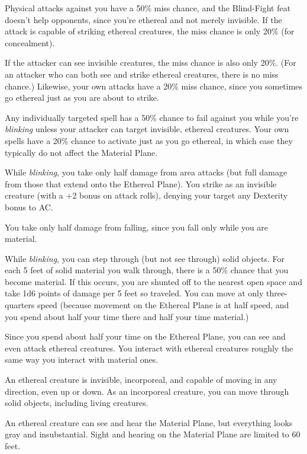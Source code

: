 \documentclass{article}
\begin{document}
Physical attacks against you have a 50\% miss chance, and the Blind-Fight feat 
doesn't help opponents, since you're ethereal and not merely invisible. If the 
attack is capable of striking ethereal creatures, the miss chance is only 20\% 
(for concealment).

If the attacker can see invisible creatures, the miss chance is also only 20\%. 
(For an attacker who can both see and strike ethereal creatures, there is no miss 
chance.) Likewise, your own attacks have a 20\% miss chance, since you sometimes 
go ethereal just as you are about to strike.

Any individually targeted spell has a 50\% chance to fail against you while you're 
\textit{blinking }unless your attacker can target invisible, ethereal creatures. 
Your own spells have a 20\% chance to activate just as you go ethereal, in which 
case they typically do not affect the Material Plane.

While \textit{blinking}, you take only half damage from area attacks (but full 
damage from those that extend onto the Ethereal Plane). You strike as an invisible 
creature (with a +2 bonus on attack rolls), denying your target any Dexterity bonus 
to AC.

You take only half damage from falling, since you fall only while you are material.

While \textit{blinking}, you can step through (but not see through) solid objects. 
For each 5 feet of solid material you walk through, there is a 50\% chance that 
you become material. If this occurs, you are shunted off to the nearest open space 
and take 1d6 points of damage per 5 feet so traveled. You can move at only three-quarters 
speed (because movement on the Ethereal Plane is at half speed, and you spend about 
half your time there and half your time material.)

Since you spend about half your time on the Ethereal Plane, you can see and even 
attack ethereal creatures. You interact with ethereal creatures roughly the same 
way you interact with material ones.

An ethereal creature is invisible, incorporeal, and capable of moving in any direction, 
even up or down. As an incorporeal creature, you can move through solid objects, 
including living creatures.

An ethereal creature can see and hear the Material Plane, but everything looks 
gray and insubstantial. Sight and hearing on the Material Plane are limited to 
60 feet.
\end{document}
